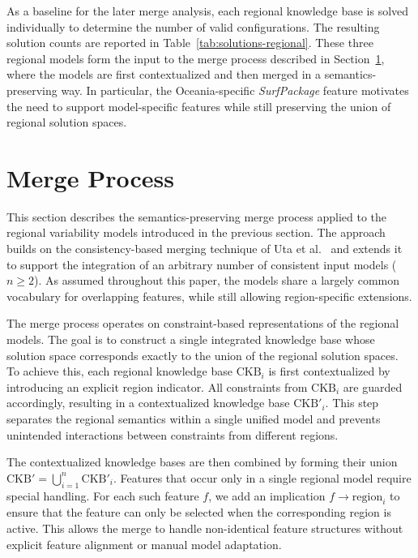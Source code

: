 \documentclass{ceurart}
\begin{document}
As a baseline for the later merge analysis, each regional knowledge
base is solved individually to determine the number of valid
configurations.  The resulting solution counts are reported in
Table~\ref{tab:solutions-regional}.  These three regional models form
the input to the merge process described in
Section~\ref{sec:merge}, where the models are first contextualized and
then merged in a semantics-preserving way.  In particular, the
Oceania-specific \textit{SurfPackage} feature motivates the need to
support model-specific features while still preserving the union of
regional solution spaces.

\section{Merge Process}
\label{sec:merge}
This section describes the semantics-preserving merge process applied
to the regional variability models introduced in the previous section.
The approach builds on the consistency-based merging technique of
Uta et al.~\cite{Uta2019} and extends it to support the integration of
an arbitrary number of consistent input models ($n \ge 2$). As
assumed throughout this paper, the models share a largely common
vocabulary for overlapping features, while still allowing
region-specific extensions.

The merge process operates on constraint-based representations of the
regional models. The goal is to construct a single integrated knowledge
base whose solution space corresponds exactly to the union of the
regional solution spaces. To achieve this, each regional knowledge base
$\mathrm{CKB}_i$ is first contextualized by introducing an explicit
region indicator. All constraints from $\mathrm{CKB}_i$
are guarded accordingly, resulting in a contextualized knowledge base
$\mathrm{CKB}'_i$. This step separates the regional semantics within a
single unified model and prevents unintended interactions between
constraints from different regions.

The contextualized knowledge bases are then combined by forming their
union
$\mathrm{CKB}' = \bigcup_{i=1}^{n} \mathrm{CKB}'_i$.
Features that occur only in a single regional model require special handling. For each such feature $f$, we add an implication
$f \rightarrow \mathrm{region}_i$ to ensure that the feature
can only be selected when the corresponding region is active. This
allows the merge to handle non-identical feature
structures without explicit feature alignment or manual
model adaptation.
\end{document}
